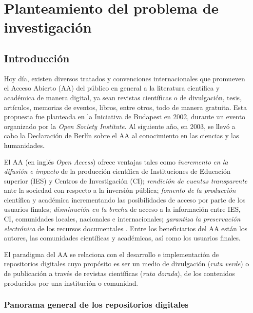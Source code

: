 \renewcommand{\chaptername}{Capitulo}
\chapter{Planteamiento del problema de investigación} 

\section{Introducción}

Hoy día, existen diversos tratados y convenciones internacionales que promueven el Acceso Abierto (AA) del público en general a la literatura científica y académica de manera digital, ya sean revistas científicas o de divulgación, tesis, artículos, memorias de eventos, libros, entre otros, todo de manera gratuita. Esta propuesta fue planteada en la Iniciativa de Budapest \cite{para2010abierto} en 2002, durante un evento organizado por la \textit{Open Society Institute}. Al siguiente año, en 2003, se llevó a cabo la Declaración de Berlín sobre el AA al conocimiento en las ciencias y las humanidades.\newline

El AA (en inglés \textit{Open Access}) ofrece ventajas tales como \textit{incremento en la difusión e impacto} de la producción científica de Instituciones de Edu\-cación superior (IES) y Centros de Investigación (CI); \textit{rendición de cuentas transparente} ante la sociedad con respecto a la inversión pública; \textit{fomento de la producción} científica y académica incrementando las posibilidades de acceso por parte de los usuarios finales; \textit{dis\-mi\-nu\-ción en la brecha} de acceso a la información entre IES, CI, comunidades locales, nacionales e internacionales; \textit{garantiza la preservación electrónica} de los recursos documentales \cite{BeneficiosAA}. Entre los beneficiarios del AA están los autores, las comunidades científicas y académicas, así como los usuarios finales.\newline

El paradigma del AA se relaciona con el desarrollo e implementación de repo\-sitorios digitales cuyo propósito es ser un medio de divulgación (\textit{ruta verde}) o de publicación a través de revistas científicas (\textit{ruta dorada}), de los contenidos producidos por una institución o comunidad.\newline

\subsection{Panorama general de los repositorios digitales}

